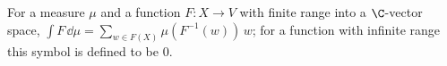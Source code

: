 For a measure $\mu$ and a function $F\colon X\to V$ with finite range into a $\C$-vector space, $\int F\,\dd\mu=\sum_{w\in F(X)}\mu(F^{-1}(w))\,w$; for a function with infinite range this symbol is defined to be $0$.
